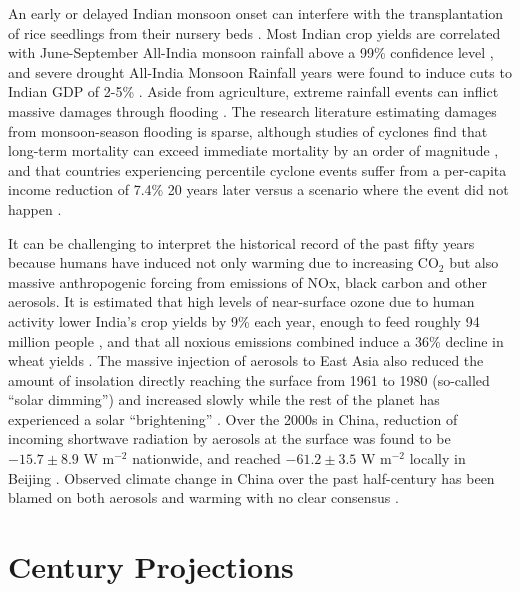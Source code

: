 	An early or delayed Indian monsoon onset can interfere with the transplantation of rice seedlings from their nursery beds \citep{Gadgil2006a}. Most Indian crop yields are correlated with June-September All-India monsoon rainfall above a 99\% confidence level \citep{KrishnaKumar2004}, and severe drought All-India Monsoon Rainfall years were found to induce cuts to Indian GDP of 2-5\% \citep{Gadgil2006}. Aside from agriculture, extreme rainfall events can inflict massive damages through flooding \citep{Li2012}. The research literature estimating damages from monsoon-season flooding is sparse, although studies of cyclones find that long-term mortality can exceed immediate mortality by an order of magnitude \citep{Anttila-Hughes2012}, and that countries experiencing  percentile cyclone events  suffer from a per-capita income reduction of 7.4\% 20 years later versus a scenario where the event did not happen \citep{Hsiang2014}.
	
	It can be challenging to interpret the historical record of the past fifty years because humans have induced not only warming due to increasing CO$_2$ but also massive anthropogenic forcing from emissions of NOx, black carbon and other aerosols. It is estimated that high levels of near-surface ozone due to human activity lower India's crop yields by 9\% each year, enough to feed roughly 94 million people \citep{Ghude2014}, and that all noxious emissions combined induce a 36\% decline in wheat yields \citep{Burney2014}. The massive injection of aerosols to East Asia also reduced the amount of insolation directly reaching the surface from 1961 to 1980 (so-called ``solar dimming'') and increased slowly while the rest of the planet has experienced a solar ``brightening'' \citep{Norris2009}. Over the 2000s in China, reduction of incoming shortwave radiation by aerosols at the surface was found to be $-15.7 \pm 8.9$ W m$^{-2}$ nationwide, and reached $-61.2 \pm 3.5$ W m$^{-2}$ locally in Beijing \citep{Li2010b}. Observed climate change in China over the past half-century has been blamed on both aerosols and warming with no clear consensus \citep{Menon2002,Yang2015,Yu2016,Yang2016}.
	
\section{ Century Projections}

